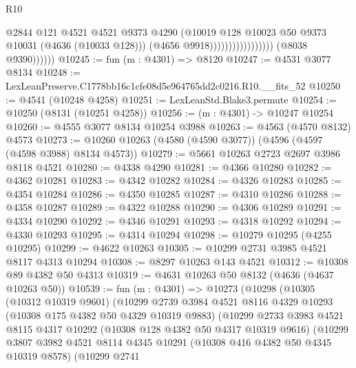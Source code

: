 \begin{lexlean}{R10}
\begin{coremodule}
                                              @2844
                                              @121
                                              @4521
                                              @4521
                                              @9373
                                              @4290
                                              (@10019
                                                @128
                                                @10023
                                                @50
                                                @9373
                                                @10031
                                                (@4636 (@10033 @128)))
                                              (@4656 @9918)))))))))))))))))
              (@8038 @9390))))))
@10245 := fun (m : @4301) => @8120
@10247 := @4531 @3077 @8134
@10248 := LexLeanPreserve.C1778bb16c1cfe08d5e964765dd2c0216.R10.__fits_52
@10250 := @4541 (@10248 @4258)
@10251 := LexLeanStd.Blake3.permute
@10254 := @10250 (@8131 (@10251 @4258))
@10256 := (m : @4301) -> @10247 @10254
@10260 := @4555 @3077 @8134 @10254 @3988
@10263 := @4563 (@4570 @8132) @4573
@10273 := @10260 @10263 (@4580 (@4590 @3077)) (@4596 (@4597 (@4598 @3988) @8134 @4573))
@10279 := @5661 @10263 @2723 @2697 @3986 @8118 @4521
@10280 := @4338 @4290
@10281 := @4366 @10280
@10282 := @4362 @10281
@10283 := @4342 @10282
@10284 := @4326 @10283
@10285 := @4354 @10284
@10286 := @4350 @10285
@10287 := @4310 @10286
@10288 := @4358 @10287
@10289 := @4322 @10288
@10290 := @4306 @10289
@10291 := @4334 @10290
@10292 := @4346 @10291
@10293 := @4318 @10292
@10294 := @4330 @10293
@10295 := @4314 @10294
@10298 := @10279 @10295 (@4255 @10295)
@10299 := @4622 @10263
@10305 := @10299 @2731 @3985 @4521 @8117 @4313 @10294
@10308 := @8297 @10263 @143 @4521
@10312 := @10308 @89 @4382 @50 @4313
@10319 := @4631 @10263 @50 @8132 (@4636 (@4637 @10263 @50))
@10539 := fun (m : @4301) =>
  @10273
    (@10298
      (@10305
        (@10312 @10319 @9601)
        (@10299
          @2739
          @3984
          @4521
          @8116
          @4329
          @10293
          (@10308 @175 @4382 @50 @4329 @10319 @9883)
          (@10299
            @2733
            @3983
            @4521
            @8115
            @4317
            @10292
            (@10308 @128 @4382 @50 @4317 @10319 @9616)
            (@10299
              @3807
              @3982
              @4521
              @8114
              @4345
              @10291
              (@10308 @416 @4382 @50 @4345 @10319 @8578)
              (@10299
                @2741

\end{coremodule}
\end{lexlean}
